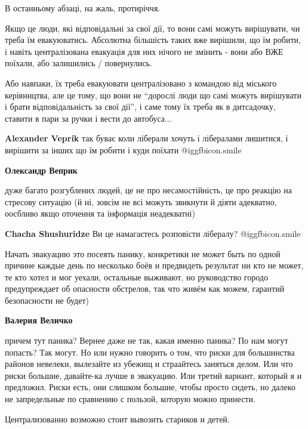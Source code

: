 \begin{itemize}

В останньому абзаці, на жаль, протиріччя.

Якщо це люди, які відповідальні за свої дії, то вони самі можуть вирішувати, чи
треба їм евакуюватись. Абсолютна більшість таких вже вирішили, що їм робити, і
навіть централізована евакуація для них нічого не змінить - вони або ВЖЕ
поїхали, або залишились / повернулись.

Або навпаки, їх треба евакуювати централізовано з командою від міського
керівництва, але це тому, що вони не \enquote{дорослі люди що самі можуть вирішувати і
брати відповідальність за свої дії}, і саме тому їх треба як в дитсадочку,
ставити в пари за ручки і вести до автобуса...

\begin{itemize} %
\textbf{Alexander Veprik} так буває коли ліберали хочуть і лібералами лишитися, і вирішити за інших що їм робити і куди поїхати  @igg{fbicon.smile} 

\textbf{Олександр Веприк} 

дуже багато розгублених людей, це не про несамостійність, це про реакцію на
стресову ситуацію (й ні, зовсім не всі можуть звикнути й діяти адекватно,
оосбливо якщо оточення та інформація неадекватні)

\textbf{Chacha Shushuridze} Ви це намагаєтесь розповісти лібералу?  @igg{fbicon.smile} 
\end{itemize} %


Начать эвакуацию это посеять панику, конкретики не может быть по одной причине
каждые день по несколько боёв и предвидеть результат ни кто не может, те кто
хотел и мог уехали, остальные выживают, но руководство городо предупреждает об
опасности обстрелов, так что живём как можем, гарантий безопасности не будет)

\textbf{Валерия Величко} 

причем тут паника? Вернее даже не так, какая именно паника? По нам могут
попасть? Так могут. Но или нужно говорить о том, что риски для большинства
районов невелеки, вылезайте из убежищ и страайтесь заняться делом. Или что
риски большие, давайте-ка лучше в эвакуацию. Или третий вариант, который я и
предложил. Риски есть, они слишком большие, чтобы просто сидеть, но далеко не
запредельные по сравнению с пользой, которую можно принести.

Централизованно возможно стоит вывозить стариков и детей.


\end{itemize}
